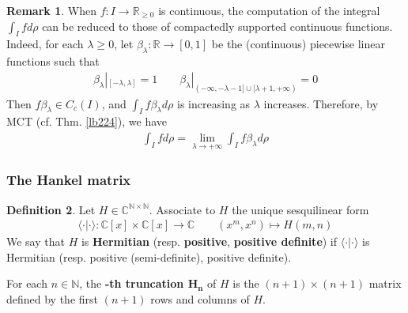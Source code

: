 \documentclass[12pt,b5paper,notitlepage]{article}
\theoremstyle{definition}
\newtheorem{df}{Definition}[subsection]
\newtheorem{eg}[df]{Example}
\newtheorem{rem}[df]{Remark}
\theoremstyle{plain}
\newcommand{\bk}[1]{\langle {#1}\rangle}
\newcommand{\Cbb}{\mathbb C}
\newcommand{\Nbb}{\mathbb N}
\newcommand{\Rbb}{\mathbb R}
\numberwithin{equation}{section}
\begin{document}
\begin{rem}\label{lb176}
When $f:I\rightarrow\Rbb_{\geq0}$ is continuous, the computation of the integral $\int_Ifd\rho$ can be reduced to those of compactedly supported continuous functions. Indeed, for each $\lambda\geq0$, let $\beta_\lambda:\Rbb\rightarrow[0,1]$ be the (continuous) piecewise linear functions such that
\begin{align*}
\beta_\lambda|_{[-\lambda,\lambda]}=1\qquad \beta_\lambda|_{(-\infty,-\lambda-1]\cup[\lambda+1,+\infty)}=0
\end{align*}
Then $f\beta_\lambda\in C_c(I)$, and $\int_I f\beta_\lambda d\rho$ is increasing as $\lambda$ increases. Therefore, by MCT (cf. Thm. \ref{lb224}), we have
\begin{align*}
\int_I fd\rho=\lim_{\lambda\rightarrow+\infty}\int_I f\beta_\lambda d\rho
\end{align*}
\end{rem}

\begin{comment}
\begin{eg}
If $I=[0,1]$, then $\int_I d\rho=\rho(1)$. If $I$ equals $\Rbb$ or $\Rbb_{\geq0}$, then
\begin{align*}
\int_I d\rho=\lim_{x\rightarrow+\infty}\rho(x)
\end{align*}
\end{eg}

\begin{proof}
When $I=[0,1]$, the definition of Stieltjes integral clearly imply $\int_Id\rho=\rho(1)$. Assume that $I$ is $\Rbb$ or $\Rbb_{\geq0}$. Recall from \eqref{eq42} that $\rho(x)=\mu(I_{\leq x})$, and hence
\begin{align*}
\lim_{x\rightarrow+\infty}\rho(x)=\lim_{x\rightarrow+\infty} \int_I \chi_{I_{\leq x}}d\rho=\int_Id\rho
\end{align*}
where the last equality is due to MCT.
\end{proof}
\end{comment}






\subsubsection{The Hankel matrix}


\begin{df}
Let $H\in\Cbb^{\Nbb\times\Nbb}$. Associate to $H$ the unique sesquilinear form
\begin{align*}
\bk{\cdot|\cdot}:\Cbb[x]\times\Cbb[x]\rightarrow\Cbb\qquad (x^m,x^n)\mapsto H(m,n)
\end{align*} 
We say that $H$ is \textbf{Hermitian} (resp. \textbf{positive}, \textbf{positive definite}) if $\bk{\cdot|\cdot}$ is Hermitian (resp. positive (semi-definite), positive definite). 

For each $n\in\Nbb$, the \textbf{-th truncation $\pmb{H_n}$} of $H$ is the $(n+1)\times(n+1)$ matrix defined by the first $(n+1)$ rows and columns of $H$. \hfill
\end{df}
\end{document}
